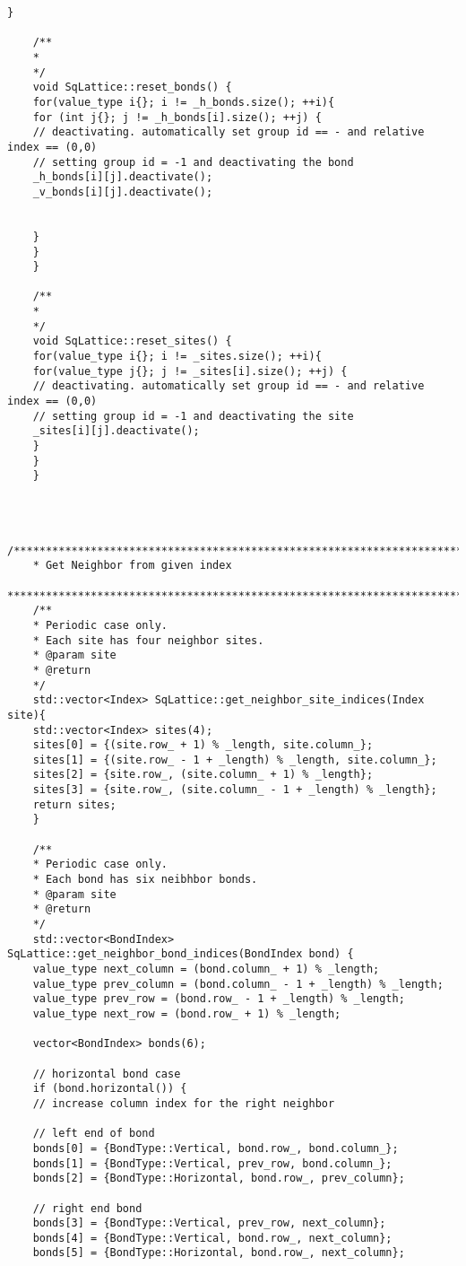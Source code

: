 \begin{lstlisting}[style=CStyle]
	}
	
	/**
	*
	*/
	void SqLattice::reset_bonds() {
	for(value_type i{}; i != _h_bonds.size(); ++i){
	for (int j{}; j != _h_bonds[i].size(); ++j) {
	// deactivating. automatically set group id == - and relative index == (0,0)
	// setting group id = -1 and deactivating the bond
	_h_bonds[i][j].deactivate();
	_v_bonds[i][j].deactivate();
	
	
	}
	}
	}
	
	/**
	*
	*/
	void SqLattice::reset_sites() {
	for(value_type i{}; i != _sites.size(); ++i){
	for(value_type j{}; j != _sites[i].size(); ++j) {
	// deactivating. automatically set group id == - and relative index == (0,0)
	// setting group id = -1 and deactivating the site
	_sites[i][j].deactivate();
	}
	}
	}
	
	
	
	/******************************************************************************
	* Get Neighbor from given index
	******************************************************************************/
	/**
	* Periodic case only.
	* Each site has four neighbor sites.
	* @param site
	* @return
	*/
	std::vector<Index> SqLattice::get_neighbor_site_indices(Index site){
	std::vector<Index> sites(4);
	sites[0] = {(site.row_ + 1) % _length, site.column_};
	sites[1] = {(site.row_ - 1 + _length) % _length, site.column_};
	sites[2] = {site.row_, (site.column_ + 1) % _length};
	sites[3] = {site.row_, (site.column_ - 1 + _length) % _length};
	return sites;
	}
	
	/**
	* Periodic case only.
	* Each bond has six neibhbor bonds.
	* @param site
	* @return
	*/
	std::vector<BondIndex> SqLattice::get_neighbor_bond_indices(BondIndex bond) {
	value_type next_column = (bond.column_ + 1) % _length;
	value_type prev_column = (bond.column_ - 1 + _length) % _length;
	value_type prev_row = (bond.row_ - 1 + _length) % _length;
	value_type next_row = (bond.row_ + 1) % _length;
	
	vector<BondIndex> bonds(6);
	
	// horizontal bond case
	if (bond.horizontal()) {
	// increase column index for the right neighbor
	
	// left end of bond
	bonds[0] = {BondType::Vertical, bond.row_, bond.column_};
	bonds[1] = {BondType::Vertical, prev_row, bond.column_};
	bonds[2] = {BondType::Horizontal, bond.row_, prev_column};
	
	// right end bond
	bonds[3] = {BondType::Vertical, prev_row, next_column};
	bonds[4] = {BondType::Vertical, bond.row_, next_column};
	bonds[5] = {BondType::Horizontal, bond.row_, next_column};
	

\end{lstlisting}
